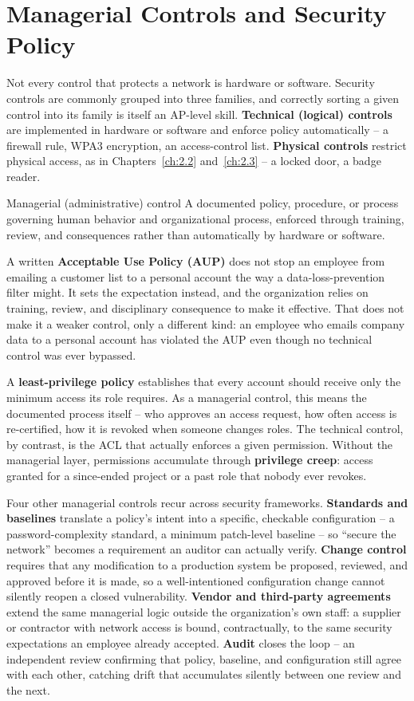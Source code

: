 \section{Managerial Controls and Security Policy}

Not every control that protects a network is hardware or software. Security controls are commonly
grouped into three families, and correctly sorting a given control into its family is itself an
AP-level skill. \textbf{Technical (logical) controls} are implemented in hardware or software and
enforce policy automatically -- a firewall rule, WPA3 encryption, an access-control list.
\textbf{Physical controls} restrict physical access, as in Chapters~\ref{ch:2.2}
and~\ref{ch:2.3} -- a locked door, a badge reader.

\begin{definition}{Managerial (administrative) control}
A documented policy, procedure, or process governing human behavior and organizational process,
enforced through training, review, and consequences rather than automatically by hardware or
software.
\end{definition}

A written \textbf{Acceptable Use Policy (AUP)} does not stop an employee from emailing a customer
list to a personal account the way a data-loss-prevention filter might. It sets the expectation
instead, and the organization relies on training, review, and disciplinary consequence to make it
effective. That does not make it a weaker control, only a different kind: an employee who emails
company data to a personal account has violated the AUP even though no technical control was ever
bypassed.

A \textbf{least-privilege policy} establishes that every account should receive only the minimum
access its role requires. As a managerial control, this means the documented process itself -- who
approves an access request, how often access is re-certified, how it is revoked when someone
changes roles. The technical control, by contrast, is the ACL that actually enforces a given
permission. Without the managerial layer, permissions accumulate through \textbf{privilege creep}:
access granted for a since-ended project or a past role that nobody ever revokes.

Four other managerial controls recur across security frameworks. \textbf{Standards and baselines}
translate a policy's intent into a specific, checkable configuration -- a password-complexity
standard, a minimum patch-level baseline -- so ``secure the network'' becomes a requirement an
auditor can actually verify. \textbf{Change control} requires that any modification to a production
system be proposed, reviewed, and approved before it is made, so a well-intentioned configuration
change cannot silently reopen a closed vulnerability. \textbf{Vendor and third-party agreements}
extend the same managerial logic outside the organization's own staff: a supplier or contractor
with network access is bound, contractually, to the same security expectations an employee already
accepted. \textbf{Audit} closes the loop -- an independent review confirming that policy, baseline,
and configuration still agree with each other, catching drift that accumulates silently between one
review and the next.

